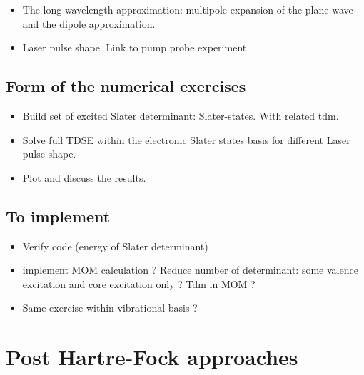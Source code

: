 \documentclass[12pt]{article}
\begin{document}
\begin{itemize}
\item The long wavelength approximation: multipole expansion of the plane wave and the dipole approximation.
\item Laser pulse shape. Link to pump probe experiment
\end{itemize}

\subsection{Form of the numerical exercises}
\begin{itemize}
\item Build set of excited Slater determinant: Slater-states. With related tdm. 
\item Solve full TDSE within the electronic Slater states basis for different Laser pulse shape. 
\item Plot and discuss the results. 
\end{itemize}

\subsection{To implement}
\begin{itemize}
\item Verify code (energy of Slater determinant)
\item implement MOM calculation ? Reduce number of determinant: some valence excitation and core excitation only ? Tdm in MOM ?
\item Same exercise within vibrational basis ? 
\end{itemize}

\section{Post Hartre-Fock approaches}
\end{document}
